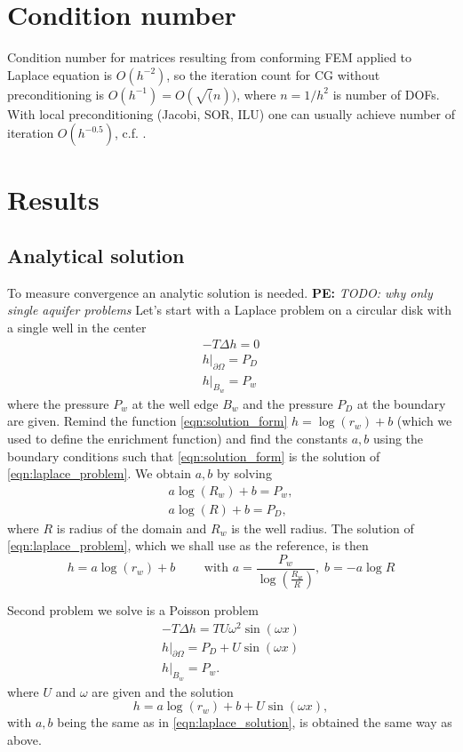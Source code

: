 \documentclass[preprint,12pt]{elsarticle}
\newcommand{\notePE}[1]{{\color{Orange} \textbf{PE: } \textit{#1}}}
\begin{document}
\section{Condition number}
Condition number for matrices resulting from conforming FEM applied to Laplace equation is $O(h^{-2})$, so the iteration count 
for CG without preconditioning is $O(h^{-1})=O(\sqrt(n))$, where $n=1/h^2$ is number of DOFs. With local preconditioning (Jacobi, 
SOR, ILU) one can usually achieve number of iteration $O(h^{-0.5})$, c.f. \cite{ern_evaluation_2006}.


\section{Results}
\label{sec:results}

\subsection{Analytical solution}
To measure convergence an analytic solution is needed. 
\notePE{TODO: why only single aquifer problems}
Let's start with a Laplace problem on a circular disk
with a single well in the center
\begin{eqnarray} \label{eqn:laplace_problem}
    -T \Delta h = 0 \nonumber\\
    h|_{\partial\Omega} = P_D \\
    h|_{B_w} = P_w \nonumber
\end{eqnarray}
where the pressure $P_w$ at the well edge $B_w$ and the pressure $P_D$ at the boundary are given.
Remind the function \eqref{eqn:solution_form} $h=\log(r_w)+b$ (which we used to define the enrichment function) 
and find the constants $a,b$ using the boundary conditions such that \eqref{eqn:solution_form} is the solution 
of \eqref{eqn:laplace_problem}.
We obtain $a,b$ by solving
\begin{eqnarray*}
  a\log(R_w) + b = P_w, \\
  a\log(R) + b = P_D,
\end{eqnarray*}
where $R$ is radius of the domain and $R_w$ is the well radius.
The solution of \eqref{eqn:laplace_problem}, which we shall use as the reference, is then
\begin{equation} \label{eqn:laplace_solution}
  h=a\log(r_w)+b \qquad \textrm{ with } a=\frac{P_w}{\log\left(\frac{R_w}{R}\right)}, \; b=-a\log R
\end{equation}

Second problem we solve is a Poisson problem
\begin{eqnarray} \label{eqn:poisson_problem}
    -T \Delta h = TU\omega^2\sin(\omega x) \nonumber\\
    h|_{\partial\Omega} = P_D + U\sin(\omega x)\\
    h|_{B_w} = P_w. \nonumber
\end{eqnarray}
where $U$ and $\omega$ are given
and the solution 
\begin{equation} \label{eqn:poisson_solution}
  h=a\log(r_w)+b+U\sin(\omega x),
\end{equation}
with $a,b$ being the same as in \eqref{eqn:laplace_solution}, is obtained the same way as above.
\end{document}
